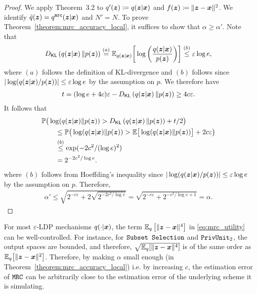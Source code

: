 \begin{proof}
We apply Theorem~3.2 \citep{HPHJ19} to $q'({\boldsymbol{z}}) \coloneqq q({\boldsymbol{z}}|{\boldsymbol{x}})$ and $f({\boldsymbol{z}}) \coloneqq \|{\boldsymbol{z}}-{\boldsymbol{x}}\|^2$. We identify $\tilde{q}({\boldsymbol{z}}) = q^{\texttt{mrc}}({\boldsymbol{z}}|{\boldsymbol{x}})$ and $N' = N$. To prove Theorem~\ref{theorem:mrc_accuracy_local}, it suffices to show that $\alpha \geq \alpha'$. Note that
\begin{align}
{D}_{\mathsf{KL}}\left( q({\boldsymbol{z}}|{\boldsymbol{x}})\, \middle\Vert p({\boldsymbol{z}}) \right) \stackrel{(a)}{=} \mathbb{E}_{q({\boldsymbol{z}}|{\boldsymbol{x}})}\bigg[\log\bigg(\dfrac{q({\boldsymbol{z}}|{\boldsymbol{x}})}{p({\boldsymbol{z}})}\bigg)\bigg] \stackrel{(b)}{\leq} \varepsilon \log e,
\end{align}
where $(a)$ follows the definition of KL-divergence and $(b)$ follows since $ |\log (q({\boldsymbol{z}}|{\boldsymbol{x}}) / p({\boldsymbol{z}})) | \leq \varepsilon \log e$ by the assumption on $p$. We therefore have
\begin{align}
    t
    = (\log e + 4c)\varepsilon - {D}_{\mathsf{KL}}\left( q({\boldsymbol{z}}|{\boldsymbol{x}})\, \middle\Vert p({\boldsymbol{z}}) \right)
    \geq 4c\varepsilon.
\end{align}
 It follows that
\begin{align}
    & \mathbb{P} \big(\log (q({\boldsymbol{z}}|{\boldsymbol{x}})\|p({\boldsymbol{z}})) > {D}_{\mathsf{KL}}\left( q({\boldsymbol{z}}|{\boldsymbol{x}})\, \middle\Vert p({\boldsymbol{z}}) \right) + t/2\big)  \\
    & \qquad \leq
    \mathbb{P} \big(\log (q({\boldsymbol{z}}|{\boldsymbol{x}})\|p({\boldsymbol{z}})) > \mathbb{E}\big[\log (q({\boldsymbol{z}}|{\boldsymbol{x}})\|p({\boldsymbol{z}}))\big] + 2c\varepsilon\big)\\
    & \qquad \stackrel{(b)}{\leq} \exp(-2c^2/(\log e)^2)\\
    & \qquad = 2^{-2c^2/\log e}.
\end{align}
where $(b)$ follows from Hoeffding's inequality since $ |\log (q({\boldsymbol{z}}|{\boldsymbol{x}}) / p({\boldsymbol{z}})) | \leq \varepsilon \log e$ by the assumption on $p$. Therefore,
\begin{align}
    \alpha'
    \leq \sqrt{2^{-c\varepsilon} + 2\sqrt{2^{-2c^2/\log e}}}
    = \sqrt{2^{-c\varepsilon} + 2^{-c^2/\log e + 1}} = \alpha.
\end{align}
\end{proof}

\begin{remark}\label{rmk:error_forth_moment}
For most $\varepsilon$-LDP mechanisms $q(\cdot|{\boldsymbol{x}})$, the term $\mathbb{E}_{q}\left[ \|{\boldsymbol{z}} - {\boldsymbol{x}}\|^4\right]$ in \eqref{eq:mrc_utility} can be well-controlled. For instance, for \emph{$\texttt{Subset Selection}$} and \emph{$\texttt{PrivUnit}_2$}, the output spaces are bounded, and therefore, $\sqrt{\mathbb{E}_{q}[\|{\boldsymbol{z}} - {\boldsymbol{x}}\|^4]}$ is of the same order as $\mathbb{E}_{q}\big[\|{\boldsymbol{z}} - {\boldsymbol{x}}\|^2\big]$. Therefore, by making $\alpha$ small enough (in Theorem~\ref{theorem:mrc_accuracy_local}) i.e. by increasing $c$, the estimation error of \emph{$\texttt{MRC}$} can be arbitrarily close to the estimation error of the underlying scheme it is simulating.
\end{remark}

